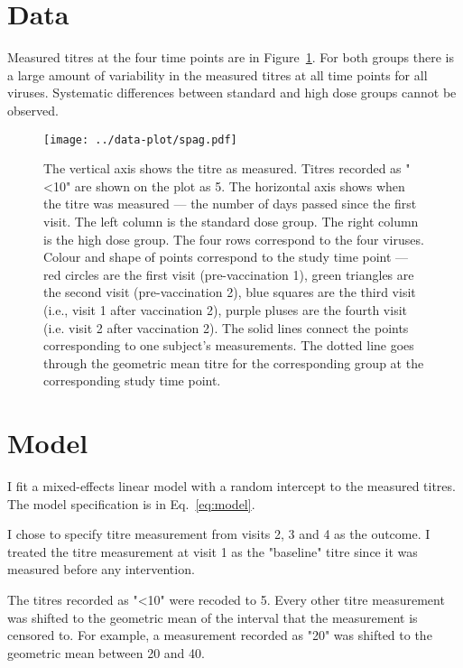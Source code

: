 \documentclass[11pt]{article}
\begin{document}
\section{Data}

Measured titres at the four time points are in Figure~\ref{fig:spag}.
For both groups there is a large amount of variability in the measured titres
at all time points for all viruses. Systematic differences between standard and
high dose groups cannot be observed.

\begin{figure}[htp]
    \centering
    \texttt{[image: ../data-plot/spag.pdf]}
    \caption{
        The vertical axis shows the titre as measured.
        Titres recorded as "<10" are shown on the plot as 5.
        The horizontal axis shows when the titre was measured --- the number of
        days passed since the first visit.
        The left column is the standard dose group.
        The right column is the high dose group.
        The four rows correspond to the four viruses.
        Colour and shape of points correspond to the study time point ---
        red circles are the first visit (pre-vaccination 1),
        green triangles are the second visit (pre-vaccination 2),
        blue squares are the third visit (i.e., visit 1 after vaccination 2),
        purple pluses are the fourth visit (i.e. visit 2 after vaccination 2).
        The solid lines connect the points
        corresponding to one subject's measurements.
        The dotted line goes through the geometric mean titre for the
        corresponding group at the corresponding study time point.
    }
    \label{fig:spag}
\end{figure}

\section{Model}

I fit a mixed-effects linear model with a random intercept
to the measured titres.
The model specification is in Eq.~\ref{eq:model}.

I chose to specify titre measurement from visits 2, 3 and 4 as the outcome.
I treated the titre measurement at visit 1 as the "baseline" titre since
it was measured before any intervention.

The titres recorded as "<10" were recoded to 5. Every other titre measurement
was shifted to the geometric mean of the interval that the measurement
is censored to. For example, a measurement recorded as "20" was shifted to the
geometric mean between 20 and 40.
\end{document}
